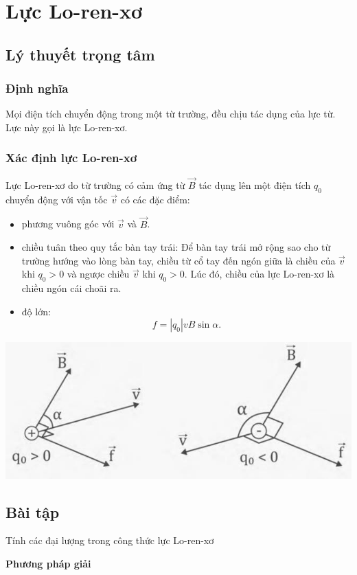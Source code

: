 \chapter{Lực Lo-ren-xơ}
\section{Lý thuyết trọng tâm}
\subsection{Định nghĩa}
Mọi điện tích chuyển động trong một từ trường, đều chịu tác dụng của lực từ. Lực này gọi là lực Lo-ren-xơ.
\subsection{Xác định lực Lo-ren-xơ}
Lực Lo-ren-xơ do từ trường có cảm ứng từ $\vec{B}$ tác dụng lên một điện tích $q_0$ chuyển động với vận tốc $\vec{v}$ có các đặc điểm:
\begin{itemize}
	\item phương vuông góc với $\vec{v}$ và $\vec{B}$. 
	\item chiều tuân theo quy tắc bàn tay trái: Để bàn tay trái mở rộng sao cho từ trường hướng vào lòng bàn tay, chiều từ cổ tay đến ngón giữa là chiều của $\vec{v}$ khi $q_0>0$ và ngược chiều $\vec{v}$  khi $q_0>0$. Lúc đó, chiều của lực Lo-ren-xơ là chiều ngón cái choãi ra.
	\item độ lớn:
\begin{equation}
f=\left|q_0 \right|vB\sin \alpha.
\end{equation}
\end{itemize}
\begin{center}
	\includegraphics[scale=0.8]{../figs/VN11-PH-27-L-019-1-h72.jpg}
\end{center}
 
\section{Bài tập }
\begin{dang}{Tính các đại lượng trong công thức lực Lo-ren-xơ}
\end{dang}
\textbf{Phương pháp giải}

